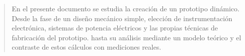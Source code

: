 \documentclass[journal,spanish,letter,12pt]{IEEEtran}
\begin{document}


\begin{abstract}
En el presente documento se estudia la creación de un prototipo dinámico. 
Desde la fase de un diseño mecánico simple, elección de instrumentación electrónica, sistemas de potencia eléctricos y las propias técnicas de fabricación del prototipo.
hasta su análisis mediante un modelo teórico y el contraste de estos cálculos con mediciones reales.

\end{abstract}









\printbibliography
\end{document}
